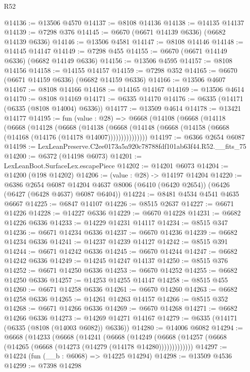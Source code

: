 \begin{lexlean}{R52}
\begin{coremodule}
@14136 := @13506 @4570
@14137 := @8108 @14136
@14138 := @14135 @14137
@14139 := @7298 @376
@14145 := @6670 (@6671 @14139 @6336) (@6682 @14139 @6336)
@14146 := @13506 @4581
@14147 := @8108 @14146
@14148 := @14145 @14147
@14149 := @7298 @455
@14155 := @6670 (@6671 @14149 @6336) (@6682 @14149 @6336)
@14156 := @13506 @4595
@14157 := @8108 @14156
@14158 := @14155 @14157
@14159 := @7298 @352
@14165 := @6670 (@6671 @14159 @6336) (@6682 @14159 @6336)
@14166 := @13506 @4607
@14167 := @8108 @14166
@14168 := @14165 @14167
@14169 := @13506 @4614
@14170 := @8108 @14169
@14171 := @6335 @14170
@14176 := @6335 (@14171 (@6335 (@8108 @14004) @6336))
@14177 := @13509 @4614
@14178 := @13421 @14177
@14195 := fun (value : @28) =>
  @6668
    (@14108
      (@6668
        (@14118
          (@6668
            (@14128
              (@6668
                (@14138
                  (@6668 (@14148 (@6668 (@14158 (@6668 (@14168 (@14176 (@14178 @14007)))))))))))))))
@14197 := @6366 @2654 @6087
@14198 := LexLeanPreserve.C2ee0173a5a920c78788fdf101ab63f44.R52.__fits_75
@14200 := @6372 (@14198 @6073)
@14201 := LexLeanBoot.SurfaceLex.escapePiece
@14202 := @14201 @6073
@14204 := @14200 (@198 @14202)
@14206 := (value : @28) -> @14197 @14204
@14220 := @6386
    @2654
    @6087
    @14204
    @4637
    @8006
    (@6410 (@6420 @2654))
    (@6426 (@6427 (@6428 @4637) @6087 @6404))
@14224 := @8481 @4534 @4541 @4635 @6667
@14225 := @6847 @14107
@14226 := @8515 @2637
@14227 := @6671 @14226
@14228 := @14227 @6336
@14229 := @6670 @14228
@14231 := @6682 @14226 @6336
@14233 := @14229 @14231 @14117
@14234 := @8515 @347
@14236 := @6671 @14234 @6336
@14237 := @6670 @14236
@14239 := @6682 @14234 @6336
@14241 := @14237 @14239 @14127
@14242 := @8515 @391
@14244 := @6671 @14242 @6336
@14245 := @6670 @14244
@14247 := @6682 @14242 @6336
@14249 := @14245 @14247 @14137
@14250 := @8515 @376
@14252 := @6671 @14250 @6336
@14253 := @6670 @14252
@14255 := @6682 @14250 @6336
@14257 := @14253 @14255 @14147
@14258 := @8515 @455
@14260 := @6671 @14258 @6336
@14261 := @6670 @14260
@14263 := @6682 @14258 @6336
@14265 := @14261 @14263 @14157
@14266 := @8515 @352
@14268 := @6671 @14266 @6336
@14269 := @6670 @14268
@14271 := @6682 @14266 @6336
@14273 := @14269 @14271 @14167
@14279 := @6335 (@14171 (@6335 (@8108 (@14003 @6082)) @6336))
@14280 := @14006 @6082
@14294 := @6668
    (@14233
      (@6668
        (@14241
          (@6668
            (@14249 (@6668 (@14257 (@6668 (@14265 (@6668 (@14273 (@14279 (@14178 @14280)))))))))))))
@14297 := @14224 (fun (__b : @6068) => @14225 @14294)
@14298 := @13509 @4536
@14299 := @7398 @14298

\end{coremodule}
\end{lexlean}
